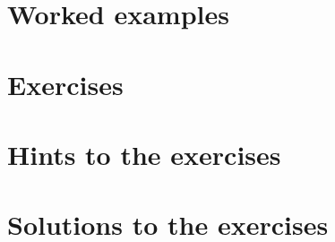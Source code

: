 \section{Worked examples}


\section{Exercises}


\ifdefined\IncludeExerciseHints
\section*{Hints to the exercises}

\fi

\ifdefined\IncludeExerciseSolutions
\section*{Solutions to the exercises}

\fi

